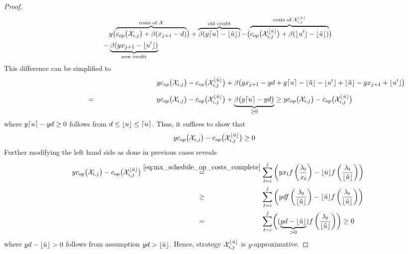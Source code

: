 \begin{proof}
\begin{align*}
	&y\bigl(\overbrace{c_{op}\bigl(\mathcal{X}_{i,j}\bigr)+\beta(x_{j+1}-d)}^{\text{costs of }\mathcal{X}}\bigr)+\overbrace{\beta(y\lceil u\rceil-\lfloor\hat{u}\rfloor)}^{\text{old credit}}-\bigl(\overbrace{c_{op}\bigl(\mathcal{X}_{i,j}^{\lfloor\hat{u}\rfloor}\bigr)+\beta(\lfloor u'\rfloor-\lfloor\hat{u}\rfloor)}^{\text{costs of }\mathcal{X}_{i,j}^{\lfloor\hat{u}\rfloor}}\bigr)\\
	-&\underbrace{\beta(yx_{j+1}-\lfloor u'\rfloor)}_{\text{new credit}}
\end{align*}
This difference can be simplified to
\begin{align*}
	&&&y\opcosts\bigl(\mx_{i,j}\bigr)-\opcosts\bigl(\mx_{i,j}^{\floor{\hat{u}}}\bigr)+\beta\bigl(yx_{j+1}-yd+y\ceil{u}-\floor{\hat{u}}-\floor{u'}+\floor{\hat{u}}-yx_{j+1}+\floor{u'}\bigr)\\
	&\stackrel{\phantom{\eqref{eq:mx_schedule_op_costs_complete}}}{=}&&y\opcosts\bigl(\mx_{i,j}\bigr)-\opcosts\bigl(\mx_{i,j}^{\floor{\hat{u}}}\bigr)+\underbrace{\beta\bigl(y\ceil{u}-yd\bigr)}_{\ge 0}\ge y\opcosts\bigl(\mx_{i,j}\bigr)-\opcosts\bigl(\mx_{i,j}^{\floor{\hat{u}}}\bigr)
\end{align*}
where $y\lceil u\rceil-yd\ge 0$ follows from $d\le \lfloor u\rfloor\le \lceil u\rceil$. Thus, it suffices to show that
\begin{align}
	yc_{op}\bigl(\mathcal{X}_{i,j}\bigr)-c_{op}\bigl(\mathcal{X}_{i,j}^{\lfloor\hat{u}\rfloor}\bigr)&\ge 0\label{eq:op_cost_floor_u_hat_y_approx}
\end{align}
Further modifying the left hand side as done in previous cases reveals
\begin{align*}
	y\opcosts\bigl(\mx_{i,j}\bigr)-\opcosts\bigl(\mx_{i,j}^{\floor{\hat{u}}}\bigr)&\stackrel{\eqref{eq:mx_schedule_op_costs_complete}}{=}\sum\limits_{t=i}^{j}\left(yx_tf\left(\frac{\lambda_t}{x_t}\right)-\floor{\hat{u}}f\left(\frac{\lambda_t}{\floor{\hat{u}}}\right)\right)\\
	&\stackrel{\phantom{\eqref{eq:mx_schedule_op_costs_complete}}}{\ge}\sum\limits_{t=i}^{j}\left(ydf\left(\frac{\lambda_t}{\floor{\hat{u}}}\right)-\floor{\hat{u}}f\left(\frac{\lambda_t}{\floor{\hat{u}}}\right)\right)\\
	&\stackrel{\phantom{\eqref{eq:mx_schedule_op_costs_complete}}}{=}\sum\limits_{t=i}^{j}\biggl((\underbrace{yd-\floor{\hat{u}}}_{>0})f\left(\frac{\lambda_t}{\floor{\hat{u}}}\right)\biggr)\ge 0
\end{align*}
where $yd-\lfloor\hat{u}\rfloor>0$ follows from assumption $yd>\lfloor\hat{u}\rfloor$. Hence, strategy $\mathcal{X}_{i,j}^{\lfloor\hat{u}\rfloor}$ is $y$-approxi\-mative.


\end{proof}
